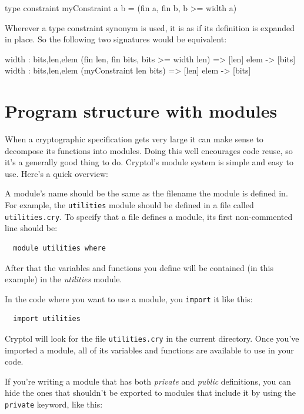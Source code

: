 \begin{code}
  type constraint myConstraint a b = (fin a, fin b, b >= width a)
\end{code}

Wherever a type constraint synonym is used, it is as if its definition
is expanded in place. So the following two signatures would be
equivalent:

\begin{code}
    width : {bits,len,elem} (fin len, fin bits, bits >= width len) =>
            [len] elem -> [bits]
    width : {bits,len,elem} (myConstraint len bits) => [len] elem -> [bits]
\end{code}

\section{Program structure with modules}

When a cryptographic specification gets very large it can make sense
to decompose its functions into modules.\indModuleSystem\indImport
Doing this well encourages
code reuse, so it's a generally good thing to do. Cryptol's module
system is simple and easy to use. Here's a quick overview:

A module's name should be the same as the filename the module is
defined in. For example, the \verb+utilities+ module should be
defined in a file called \verb+utilities.cry+. To specify that a file
defines a module, its first non-commented line should be:

\begin{verbatim}
  module utilities where
\end{verbatim}

After that the variables and functions you define will be contained
(in this example) in the {\it utilities} module.

In the code where you want to use a module, you \verb+import+ it like this:
\begin{verbatim}
  import utilities
\end{verbatim}

Cryptol will look for the file \verb+utilities.cry+ in the current directory. Once you've imported a module, all of its variables and functions are available to use in your code.

If you're writing a module that has both {\it private} and {\it public}
definitions, you can hide the ones that shouldn't be exported to modules
that include it by using the \verb+private+ keyword, like this:\indPrivate

